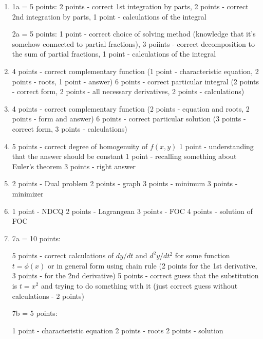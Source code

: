 \documentclass[12pt]{article} %
\theoremstyle{definition} %
\begin{document}
\begin{enumerate}
\item
1a = 5 points: 2 points - correct 1st integration by parts, 2 points - correct 2nd integration by parts, 1 point - calculations of the integral

2a = 5 points: 1 point - correct choice of solving method (knowledge that it's somehow connected to partial fractions), 3 poiints - correct decomposition to the sum of partial fractions,  1 point - calculations of the integral

\item

4 points - correct complementary function (1 point - characteristic equation, 2 points - roots, 1 point - answer)
6 points - correct particular integral (2 points - correct form, 2 points - all necessary derivatives, 2 points - calculations)

\item

4 points - correct complementary function (2 points - equation and roots, 2 points - form and answer)
6 points - correct particular solution (3 points - correct form, 3 points - calculations)

\item

5 points - correct degree of homogenuity of $f(x,y)$
1 point - understanding that the answer should be constant
1 point - recalling something about Euler's theorem
3 points - right answer

\item

2 points - Dual problem
2 points - graph
3 points - minimum
3 points - minimizer

\item

1 point - NDCQ
2 points - Lagrangean
3 points - FOC
4 points - solution of FOC

\item

7a = 10 points:

5 points - correct calculations of $dy/dt$ and $d^2y/dt^2$ for some function $t=\phi(x)$ or in general form using chain rule (2 points for the 1st derivative, 3 points - for the 2nd derivative)
5 points - correct guess that the substitution is $t= x^2$ and trying to do something with it (just correct guess without calculations - 2 points)

7b = 5 points:

1 point - characteristic equation
2 points - roots
2 points - solution


\end{enumerate}
\end{document}
